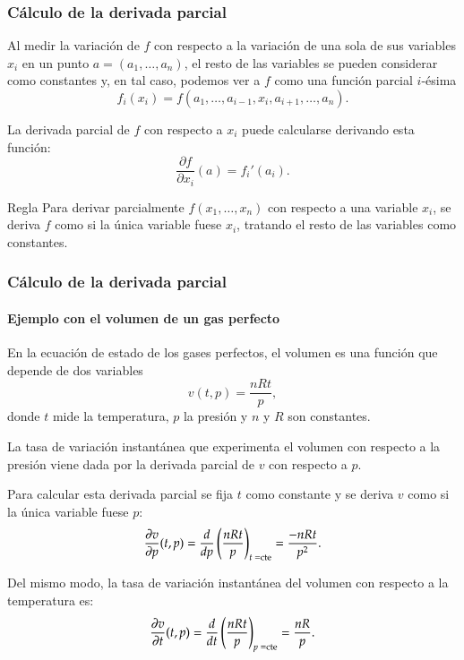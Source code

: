 \begin{frame}
\frametitle{Cálculo de la derivada parcial}
Al medir la variación de $f$ con respecto a la variación de una sola de sus variables $x_i$ en un punto
$a=(a_1,\ldots,a_n)$, el resto de las variables se pueden considerar como constantes y, en tal caso, podemos ver a $f$
como una función parcial $i$-ésima 
\[
f_i(x_i)=f(a_1,\ldots,a_{i-1},x_i,a_{i+1},\ldots,a_n).
\]

La derivada parcial de $f$ con respecto a $x_i$ puede calcularse derivando esta función:
\[
\frac{\partial f}{\partial x_i}(a)=f_i'(a_i).
\]

\begin{block}{Regla}
Para derivar parcialmente $f(x_1,\ldots,x_n)$ con respecto a una variable $x_i$, se deriva $f$ como si la única variable
fuese $x_i$, tratando el resto de las variables como constantes.
\end{block} 
\end{frame}


\begin{frame}
\frametitle{Cálculo de la derivada parcial}
\framesubtitle{Ejemplo con el volumen de un gas perfecto}
En la ecuación de estado de los gases perfectos, el volumen es una función que depende de dos variables  
\[v(t,p)=\frac{nRt}{p},\]
donde $t$ mide la temperatura, $p$ la presión y $n$ y $R$ son constantes.

La tasa de variación instantánea que experimenta el volumen con respecto a la presión viene dada por la derivada parcial de $v$ con respecto a $p$.

Para calcular esta derivada parcial se fija $t$ como constante y se deriva $v$ como si la única variable fuese $p$:
\[
\frac{\partial v}{\partial p}(t,p)=\frac{d}{dp}\left(\frac{nRt}{p}\right)_{\mbox{\scriptsize $t=$cte}}=\frac{-nRt}{p^2}.
\]

Del mismo modo, la tasa de variación instantánea del volumen con respecto a la temperatura es:
\[
\frac{\partial v}{\partial t}(t,p)=\frac{d}{dt}\left(\frac{nRt}{p}\right)_{\mbox{\scriptsize$p=$cte}}=\frac{nR}{p}.
\]
\end{frame}



